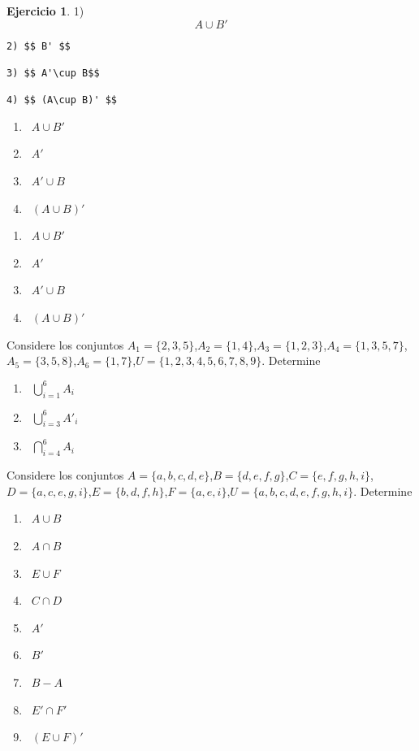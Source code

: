 \documentclass[]{book}
\theoremstyle{definition}
\theoremstyle{definition}
\theoremstyle{definition}
\newtheorem{exercise}{Ejercicio}[chapter]
\theoremstyle{remark}
\begin{document}
\begin{exercise}
\protect\hypertarget{exr:unnamed-chunk-24}{}{\label{exr:unnamed-chunk-24} }
1) \[ A\cup B'\]

\begin{verbatim}
2) $$ B' $$

3) $$ A'\cup B$$

4) $$ (A\cup B)' $$
\end{verbatim}
\end{exercise}

\begin{enumerate}
	\item \ $A\cup B'$
	\item \ $A'$
	\item \ $A'\cup B$
	\item \ $(A\cup B)'$
\end{enumerate}

\begin{enumerate}
	\item \ $A\cup B'$
	\item \ $A'$
	\item \ $A'\cup B$
	\item \ $(A\cup B)'$
\end{enumerate}

Considere los conjuntos \(A_{1}=\{2,3,5\}\),\(A_{2}=\{1,4\}\),\(A_{3}=\{1,2,3\}\),\(A_{4}=\{1,3,5,7\}\),\(A_{5}=\{3,5,8\}\),\(A_{6}=\{1,7\}\),\(U=\{1,2,3,4,5,6,7,8,9\}\). Determine

\begin{enumerate}
	\item \ $\bigcup_{i=1}^{6}A_{i}$
	\item \ $\bigcup_{i=3}^{6}A'_{i}$
	\item \ $\bigcap_{i=4}^{6}A_{i}$
\end{enumerate}

Considere los conjuntos \(A=\{a,b,c,d,e\}\),\(B=\{d,e,f,g\}\),\(C=\{e,f,g,h,i\}\),\(D=\{a,c,e,g,i\}\),\break \(E=\{b,d,f,h\}\),\(F=\{a,e,i\}\),\break \(U=\{a,b,c,d,e,f,g,h,i\}\). Determine

\begin{enumerate}
	\item \ $A\cup B$
	\item \ $A\cap B$
	\item \ $E\cup F$
	\item \ $C\cap D$
	\item \ $A'$
	\item \ $B'$
	\item \ $B-A$
	\item \ $E'\cap F'$
	\item \ $(E\cup F)'$
\end{enumerate}
\end{document}
